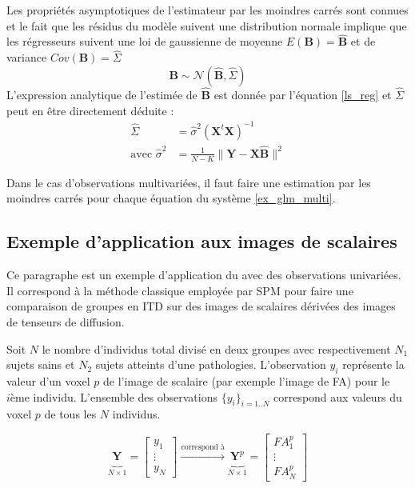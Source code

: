 Les propriétés asymptotiques de l'estimateur par les moindres carrés sont connues 
et le fait que les résidus du modèle suivent une distribution normale implique 
que les régresseurs suivent une loi de gaussienne de moyenne $E(\mathbf{B}) = \mathbf{\hat{B}}$ et de variance $Cov(\mathbf{B}) = \mathbf{\hat{\varSigma}}$
\begin{equation}
    \mathbf{B} \sim \mathcal{N}(\mathbf{\hat{B}}, \mathbf{\hat{\varSigma}})
\end{equation}
L'expression analytique de l'estimée de $\mathbf{\hat{B}}$ est donnée par l'équation \eqref{ls_reg} et $\mathbf{\hat{\varSigma}}$ peut en être directement déduite :
\begin{align}
    \mathbf{\hat{\varSigma}} &= \hat{\sigma}^{2}(\mathbf{X}^{t}\mathbf{X})^{-1} \label{ls_reg_VAR}\\
    \text{avec } \hat{\sigma}^{2} &= \frac{1}{N-K}\|\mathbf{Y} - \mathbf{X}\mathbf{\hat{B}} \|^{2} \label{ls_reg_var}
\end{align}

Dans le cas d'observations multivariées, il faut faire une estimation par les moindres carrés pour chaque équation du système \eqref{ex_glm_multi}.

\subsection{Exemple d'application aux images de scalaires}
Ce paragraphe est un exemple d'application du \mlg avec des observations univariées.
Il correspond à la méthode classique employée par SPM pour faire une comparaison de groupes en ITD sur des images de scalaires dérivées des images de tenseurs de diffusion.

Soit $N$ le nombre d'individus total divisé en deux groupes avec respectivement $N_1$ sujets sains et $N_2$ sujets atteints d'une pathologies.
L'observation $y_i$ représente la valeur d'un voxel $p$ de l'image de scalaire (par exemple l'image de \fa FA) pour le $i\text{ème}$ individu.
L'ensemble des observations $\{y_i\}_{i=1..N}$ correspond aux valeurs du voxel $p$ de tous les $N$ individus.

\begin{equation}
    \underbrace{\mathbf{Y}_{}}_{N\times 1} = \left[\begin{array}{c}
                                             y_1\\
                                             \vdots\\
                                             y_N
                                         \end{array}\right]
  \xrightarrow{\text{correspond à}} 
  \underbrace{\mathbf{Y}_{}^p}_{N\times 1} = \left[\begin{array}{c}
                                             FA_1^p\\
                                             \vdots\\
                                             FA_N^p
                                         \end{array}\right]
\end{equation}


